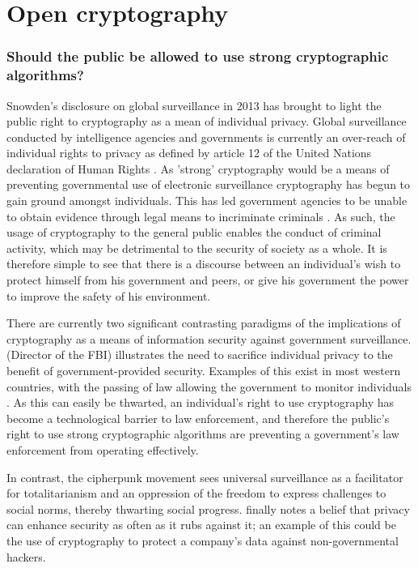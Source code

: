 \documentclass[british,10pt,a4paper]{article}
\begin{document}
\clearpage
\section{Open cryptography}
\subsubsection{Should the public be allowed to use strong cryptographic algorithms?}

Snowden's disclosure on global surveillance in 2013 has brought to light the public right to cryptography as a mean of individual privacy. Global surveillance conducted by intelligence agencies and governments is currently an over-reach of individual rights to privacy as defined by article 12 of the United Nations declaration of Human Rights \cite{udhr}. As 'strong' cryptography would be a means of preventing governmental use of electronic surveillance cryptography has begun to gain ground amongst individuals. This has led government agencies to be unable to obtain evidence through legal means to incriminate criminals \cite{James_B_Coney}. As such, the usage of cryptography to the general public enables the conduct of criminal activity, which may be detrimental to the security of society as a whole. It is therefore simple to see that there is a discourse between an individual's wish to protect himself from his government and peers, or give his government the power to improve the safety of his environment.

There are currently two significant contrasting paradigms of the implications of cryptography as a means of information security against government surveillance. \citet{James_B_Coney} (Director of the FBI) illustrates the need to sacrifice individual privacy to the benefit of government-provided security. Examples of this exist in most western countries, with the passing of law allowing the government to monitor individuals \cite{data_retention}. As this can easily be thwarted, an individual's right to use cryptography has become a technological barrier to law enforcement, and therefore the public's right to use strong cryptographic algorithms are preventing a government's law enforcement from operating effectively.

In contrast, the cipherpunk movement \cite{Rogaway} sees universal surveillance as a facilitator for totalitarianism and an oppression of the freedom to express challenges to social norms, thereby thwarting social progress. \citeauthor{Rogaway} finally notes a belief that privacy can enhance security as often as it rubs against it; an example of this could be the use of cryptography to protect a company's data against non-governmental hackers. 
\end{document}
